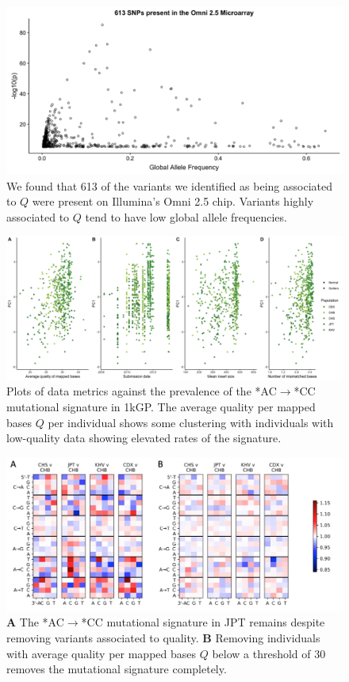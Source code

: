 \documentclass[9pt,lineno]{template}
\begin{document}
\begin{figure}[h]
\includegraphics[width=\hsize,keepaspectratio]{../Figures/Omni_AF.jpg}
\caption{We found that 613 of the variants we identified as being associated to $Q$ were present on Illumina's Omni 2.5 chip. Variants highly associated to $Q$ tend to have low global allele frequencies.}
\label{Omni}
\end{figure}

\begin{figure}[h]
\includegraphics[width=\hsize,keepaspectratio]{../Figures/PC1_Correlation.jpg}
\caption{Plots of data metrics against the prevalence of the  *AC${\rightarrow}$*CC mutational signature in 1kGP. The average quality per mapped bases $Q$ per individual shows some clustering with individuals with low-quality data showing elevated rates of the signature.  }
\label{PC1_Correlation}
\end{figure}

\begin{figure}[h]
\includegraphics[width=\hsize,keepaspectratio]{../Figures/MutationSpectrum_cutOff.png}
\caption{\textbf{A} 
The  *AC${\rightarrow}$*CC mutational signature in JPT remains despite removing variants associated to quality.
\textbf{B} 
Removing individuals with average quality per mapped bases $Q$ below a threshold of 30 removes the mutational signature completely. }
\label{MutSpect}
\end{figure}
\end{document}
